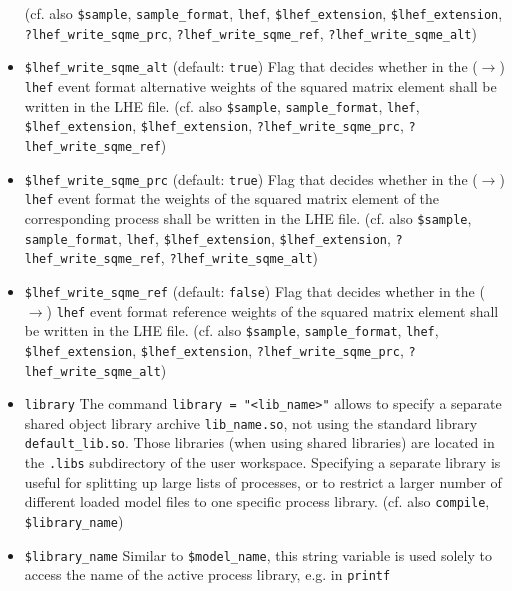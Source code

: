 \documentclass[12pt]{book}
\newcommand{\ttt}[1]{\texttt{#1}}
\begin{document}
\begin{itemize}
(cf. also \ttt{\$sample}, \ttt{sample\_format}, \ttt{lhef},
\ttt{\$lhef\_extension}, \ttt{\$lhef\_extension},
\ttt{?lhef\_write\_sqme\_prc}, \ttt{?lhef\_write\_sqme\_ref},
\ttt{?lhef\_write\_sqme\_alt})  
\item
\ttt{\$lhef\_write\_sqme\_alt} \qquad (default: \ttt{true}) \newline
Flag that decides whether in the ($\to$) \ttt{lhef} event format
alternative weights of the squared matrix element shall be written in
the LHE file. (cf. also \ttt{\$sample}, \ttt{sample\_format},
\ttt{lhef}, \ttt{\$lhef\_extension}, \ttt{\$lhef\_extension},
\ttt{?lhef\_write\_sqme\_prc}, \ttt{?lhef\_write\_sqme\_ref})   
\item
\ttt{\$lhef\_write\_sqme\_prc} \qquad (default: \ttt{true}) \newline
Flag that decides whether in the ($\to$) \ttt{lhef} event format the
weights of the squared matrix element of the corresponding process
shall be written in the LHE file. (cf. also \ttt{\$sample},
\ttt{sample\_format}, \ttt{lhef}, \ttt{\$lhef\_extension},
\ttt{\$lhef\_extension}, \ttt{?lhef\_write\_sqme\_ref},
\newline \ttt{?lhef\_write\_sqme\_alt})   
\item
\ttt{\$lhef\_write\_sqme\_ref} \qquad (default: \ttt{false}) \newline
Flag that decides whether in the ($\to$) \ttt{lhef} event format
reference weights of the squared matrix element shall be written in
the LHE file. (cf. also \ttt{\$sample}, \ttt{sample\_format},
\ttt{lhef}, \ttt{\$lhef\_extension}, \ttt{\$lhef\_extension},
\ttt{?lhef\_write\_sqme\_prc}, \ttt{?lhef\_write\_sqme\_alt})   
\item
\ttt{library} \newline
The command \ttt{library = "<lib\_name>"} allows to specify a separate
shared object library archive \ttt{lib\_name.so}, not using the
standard library \ttt{default\_lib.so}. Those libraries (when using
shared libraries) are located in the \ttt{.libs} subdirectory of the
user workspace. Specifying a separate library is useful for splitting
up large lists of processes, or to restrict a larger number of
different loaded model files to one specific process library.
(cf. also \ttt{compile}, \ttt{\$library\_name})
\item
\ttt{\$library\_name} \newline
Similar to \ttt{\$model\_name}, this string variable is used solely to
access the name of the active process library, e.g. in \ttt{printf}

\end{itemize}
\end{document}
